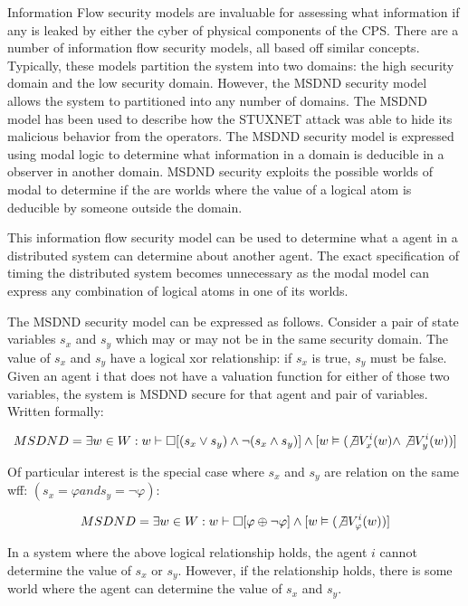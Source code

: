 Information Flow security models are invaluable for assessing what information if any is leaked by either the cyber of physical components of the CPS. There are a number of information flow security models, all based off similar concepts. Typically, these models partition the system into two domains: the high security domain and the low security domain. However, the MSDND security model allows the system to partitioned into any number of domains. The MSDND model has been used to describe how the STUXNET attack was able to hide its malicious behavior from the operators. The MSDND security model is expressed using modal logic to determine what information in a domain is deducible in a observer in another domain. MSDND security exploits the possible worlds of modal to determine if the are worlds where the value of a logical atom is deducible by someone outside the domain.

This information flow security model can be used to determine what a agent in a distributed system can determine about another agent. The exact specification of timing the distributed system becomes unnecessary as the modal model can express any combination of logical atoms in one of its worlds. 

The MSDND security model can be expressed as follows. Consider a pair of state variables $s_x$ and $s_y$ which may or may not be in the same security domain. The value of $s_x$ and $s_y$ have a logical xor relationship: if $s_x$ is true, $s_y$ must be false. Given an agent i that does not have a valuation function for either of those two variables, the system is MSDND secure for that agent and pair of variables. Written formally:

\begin{align}
MSDND = \exists w \in W : w \vdash \Box [ (s_x \vee s_y) \wedge \neg(s_x \wedge s_y) ] \wedge [ w \vDash ( \not \exists V_x^i (w) \wedge \not \exists V_y^i (w) ) ]
\end{align}

Of particular interest is the special case where $s_x$ and $s_y$ are relation on the same wff: $(s_x = \varphi and s_y = \neg \varphi)$:

\begin{align}
MSDND = \exists w \in W : w \vdash \Box [ \varphi \oplus \neg \varphi ] \wedge [ w \vDash ( \not \exists V_\varphi^i(w)) ]
\end{align}

In a system where the above logical relationship holds, the agent $i$ cannot determine the value of $s_x$ or $s_y$. However, if the relationship holds, there is some world where the agent can determine the value of $s_x$ and $s_y$.

